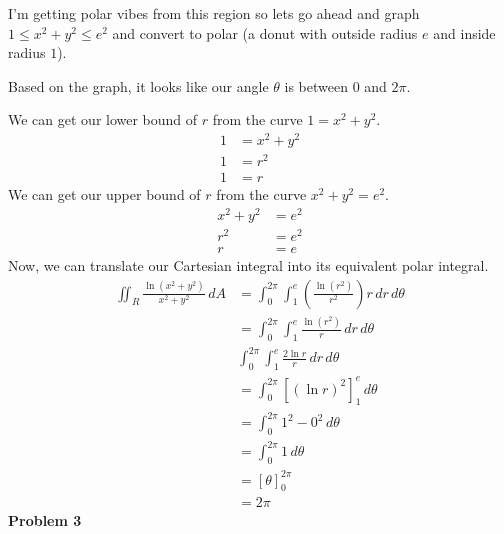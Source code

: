\documentclass{article}
\newcommand{\lrp}[1]{\left( #1 \right)}
\newcommand{\lrb}[1]{\left[ #1 \right]}
\begin{document}
I'm getting polar vibes from this region so lets go ahead and graph $1\leq x^2+y^2\leq e^2$ and convert to polar (a donut with outside radius $e$ and inside radius $1$).
\begin{center}
\end{center}
Based on the graph, it looks like our angle $\theta$ is between $0$ and $2\pi$.

We can get our lower bound of $r$ from the curve $1=x^2+y^2$.
\begin{align*}
    1&=x^2+y^2\\
    1&=r^2\tag{in polar, $x^2+y^2=r^2$}\\
    1&=r\tag{keep positive $r$}
\end{align*}
We can get our upper bound of $r$ from the curve $x^2+y^2=e^2$.
\begin{align*}
    x^2+y^2&=e^2\\
    r^2&=e^2\tag{in polar, $x^2+y^2=r^2$}\\
    r&=e\tag{keep positive $r$}
\end{align*}
Now, we can translate our Cartesian integral into its equivalent polar integral.
\begin{align*}
    \iint_R \frac{\ln(x^2+y^2)}{x^2+y^2}\,dA&=\int_0^{2\pi}\int_1^e \lrp{\frac{\ln (r^2)}{r^2}}r\,dr\,d\theta\tag{in polar, $x^2+y^2=r^2$}\\
   &= \int_0^{2\pi}\int_1^e\frac{\ln(r^2)}{r}\,dr\,d\theta\\
    &\int_0^{2\pi}\int_1^e\frac{2\ln r}{r}\,dr\,d\theta\\
    &=\int_0^{2\pi}\lrb{(\ln r)^2}_1^e\,d\theta\tag{u-sub}\\
    &=\int_0^{2\pi} 1^2 - 0^2 \,d\theta\\
    &=\int_0^{2\pi} 1 \,d\theta\\
    &=\lrb{\theta}_0^{2\pi}\\
    &=\boxed{2\pi}
\end{align*}
\textbf{Problem 3}
\end{document}
